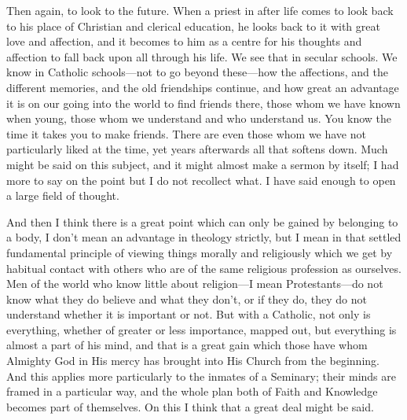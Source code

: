 Then again, to look to the future. When a priest in after life
comes to look back to his place of Christian and clerical education,
he looks back to it with great love and affection, and it becomes to
him as a centre for his thoughts and affection to fall back upon all
through his life. We see that in secular schools. We know in Catholic
schools—not to go beyond these—how the affections, and the
different memories, and the old friendships continue, and how great an
advantage it is on our going into the world to find friends there,
those whom we have known when young, those whom we understand and who
understand us. You know the time it takes you to make friends. There
are even those whom we have not particularly liked at the time, yet
years afterwards all that softens down. Much might be said on this
subject, and it might almost make a sermon by itself; I had more to
say on the point but I do not recollect what. I have said enough to
open a large field of thought.

And then I think there is a great point which can only be gained by
belonging to a body, I don't mean an advantage in theology strictly,
but I mean in that settled fundamental principle of viewing things
morally and religiously which we get by habitual contact with others
who are of the same religious profession as ourselves. Men of the
world who know little about religion—I mean Protestants—do not
know what they do believe and what they don't, or if they do, they do
not understand whether it is important or not. But with a Catholic,
not only is everything, whether of greater or less importance, mapped
out, but everything is almost a part of his mind, and that is a great
gain which those have whom Almighty God in His mercy has brought into
His Church from the beginning. And this applies more particularly to
the inmates of a Seminary; their minds are framed in a particular way,
and the whole plan both of Faith and Knowledge becomes part of
themselves. On this I think that a great deal might be said.


